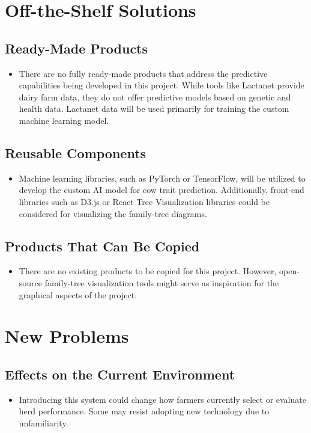 \documentclass[12pt]{article}
\begin{document}
\section{Off-the-Shelf Solutions}
\subsection{Ready-Made Products}
\begin{itemize}
	\item There are no fully ready-made products that address the predictive
	      capabilities being developed in this project. While tools like Lactanet
	      provide dairy farm data, they do not offer predictive models based on
	      genetic and health data. Lactanet data will be used primarily for
	      training the custom machine learning model.
\end{itemize}
\subsection{Reusable Components}
\begin{itemize}
	\item Machine learning libraries, such as PyTorch or TensorFlow, will be
	      utilized to develop the custom AI model for cow trait prediction.
	      Additionally, front-end libraries such as D3.js or React Tree
	      Visualization libraries could be considered for visualizing the
	      family-tree diagrams.
\end{itemize}
\subsection{Products That Can Be Copied}
\begin{itemize}
	\item There are no existing products to be copied for this project. However,
	      open-source family-tree visualization tools might serve as inspiration
	      for the graphical aspects of the project.
\end{itemize}

\section{New Problems}
\subsection{Effects on the Current Environment}
\begin{itemize}
	\item Introducing this system could change how farmers currently select or 
    evaluate herd performance. Some may resist adopting new technology due to 
    unfamiliarity.
\end{itemize}
\end{document}
